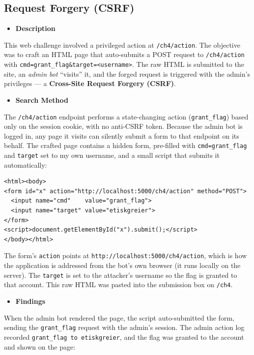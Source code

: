 \documentclass[11pt]{article}
\begin{document}
\subsection{Request Forgery (CSRF)}

\begin{itemize}[leftmargin=1.5em]
    \item \textbf{Description}
\end{itemize}
\noindent This web challenge involved a privileged action at \texttt{/ch4/action}. The objective was to craft an HTML page that auto-submits a POST request to \texttt{/ch4/action} with \texttt{cmd=grant\_flag\&target=<username>}. The raw HTML is submitted to the site, an \emph{admin bot} ``visits'' it, and the forged request is triggered with the admin's privileges --- a \textbf{Cross-Site Request Forgery (CSRF)}.

\begin{itemize}[leftmargin=1.5em]
    \item \textbf{Search Method}
\end{itemize}
\noindent The \texttt{/ch4/action} endpoint performs a state-changing action (\texttt{grant\_flag}) based only on the session cookie, with no anti-CSRF token. Because the admin bot is logged in, any page it visits can silently submit a form to that endpoint on its behalf. The crafted page contains a hidden form, pre-filled with \texttt{cmd=grant\_flag} and \texttt{target} set to my own username, and a small script that submits it automatically:

\begin{footnotesize}
\begin{verbatim}
<html><body>
<form id="x" action="http://localhost:5000/ch4/action" method="POST">
  <input name="cmd"    value="grant_flag">
  <input name="target" value="etiskgreier">
</form>
<script>document.getElementById("x").submit();</script>
</body></html>
\end{verbatim}
\end{footnotesize}

\noindent The form's \texttt{action} points at \texttt{http://localhost:5000/ch4/action}, which is how the application is addressed from the bot's own browser (it runs locally on the server). The \texttt{target} is set to the attacker's username so the flag is granted to that account. This raw HTML was pasted into the submission box on \texttt{/ch4}.

\begin{itemize}[leftmargin=1.5em]
    \item \textbf{Findings}
\end{itemize}
\noindent When the admin bot rendered the page, the script auto-submitted the form, sending the \texttt{grant\_flag} request with the admin's session. The admin action log recorded \texttt{grant\_flag to etiskgreier}, and the flag was granted to the account and shown on the page:
\end{document}
